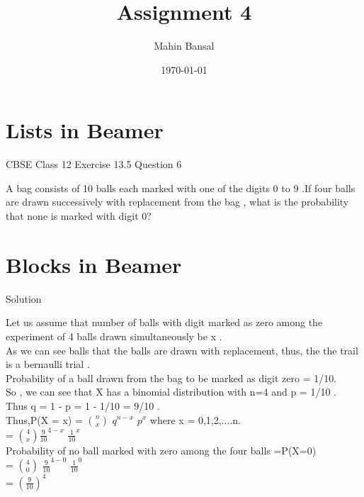 \documentclass{beamer}
\title{Assignment 4}
\author{Mahin Bansal}
\date{\today}
\begin{document}
\begin{frame}
    \titlepage 
\end{frame}

\logo{}





\section{Lists in Beamer}
\begin{frame}{ CBSE Class 12 Exercise 13.5 Question 6}

A bag consists of 10 balls each marked with one of the digits 0 to 9 .If four balls are drawn successively with replacement from the bag , what is the probability that none is marked with digit 0?
\end{frame}


\section{Blocks in Beamer}
\begin{frame}{Solution}

Let us assume that number of balls with digit marked as zero among the experiment of 4 balls drawn simultaneously be x .\\
As we can see balls that the balls are drawn with replacement, thus, the the trail is a bernaulli trial .\\
Probability of a ball drawn from the bag to be marked as digit zero  = 1/10.\\
So , we can see that X has a binomial distribution with n=4 and p = 1/10 .\\
Thus q = 1 - p = 1 - 1/10 = 9/10 .\\
Thus,P(X = x) = $ n\choose x$ $ q^{n-x}$ $ p^ x$ where x = 0,1,2,....n.\\
= $ 4\choose x$$\frac{9}{10}^{4-x}$ $ \frac{1}{10}^ x$\\
Probability of no ball marked with zero among the four balls =P(X=0)\\
= $ 4\choose 0$ $ \frac{9}{10}^{4-0}$ $ \frac{1}{10}^ 0$\\
= $(\frac{9}{10})^4$\\
\end{frame}
\end{document}
